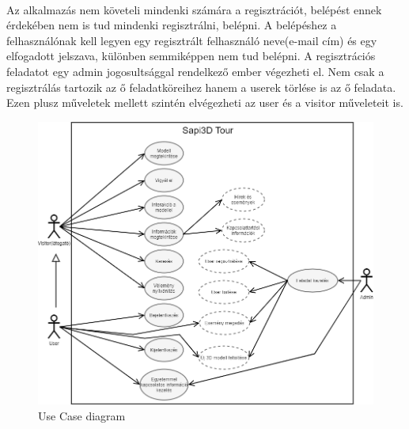 	\paragraph{}
	Az alkalmazás nem követeli mindenki számára a regisztrációt, belépést ennek érdekében nem is tud mindenki regisztrálni, belépni. A belépéshez a felhasználónak kell legyen egy regisztrált felhasználó neve(e-mail cím) és egy elfogadott jelszava, különben semmiképpen nem tud belépni. A regisztrációs feladatot egy admin jogosultsággal rendelkező ember végezheti el. Nem csak a regisztrálás tartozik az ő feladatköreihez hanem a userek törlése is az ő feladata. Ezen plusz műveletek mellett szintén elvégezheti az user és a visitor műveleteit is.
	\begin{figure}
		\centering
		\includegraphics[scale=0.6]{figures/images/UseCase.png}
		\caption{Use Case diagram}
		\label{fig:UseCase}
	\end{figure}